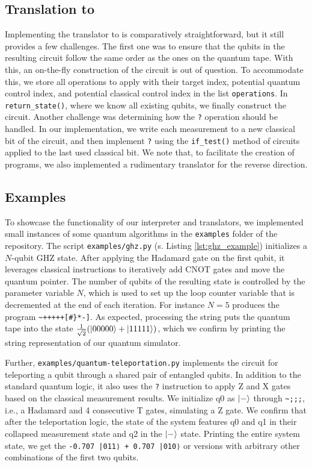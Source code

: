 \subsection{Translation to \qiskit{}}
\label{sec:approach-translations}

Implementing the translator to \qiskit{} is comparatively straightforward, but it still provides a few challenges. The first one was to ensure that the qubits in the resulting \qiskit{} circuit follow the same order as the ones on the quantum tape. With this, an on-the-fly construction of the circuit is out of question. To accommodate this, we store all operations to apply with their target index, potential quantum control index, and potential classical control index in the list \texttt{operations}. In \texttt{return\_state()}, where we know all existing qubits, we finally construct the \qiskit{} circuit.
Another challenge was determining how the \texttt{?} operation should be handled. In our implementation, we write each measurement to a new classical bit of the \qiskit{} circuit, and then implement \texttt{?} using the \texttt{if\_test()} method of \qiskit{} circuits applied to the last used classical bit.
We note that, to facilitate the creation of \bfck{} programs, we also implemented a rudimentary translator for the reverse direction.

\subsection{Examples}
\label{sec:approach-examples}

To showcase the functionality of our interpreter and translators, we implemented small instances of some quantum algorithms in the \texttt{examples} folder of the repository.
The script \texttt{examples/ghz.py} (s. Listing \ref{lst:ghz_example}) initializes a $N$-qubit GHZ state.
After applying the Hadamard gate on the first qubit, it leverages classical instructions to iteratively add CNOT gates and move the quantum pointer.
The number of qubits of the resulting state is controlled by the parameter variable $N$, which is used to set up the loop counter variable that is decremented at the end of each iteration.
For instance $N=5$ produces the \bfq{} program \texttt{\textasciitilde +++++[\#\}*-]}.
As expected, processing the string puts the quantum tape into the state $\frac{1}{\sqrt{2}} (\ket{00000} + \ket{11111})$, which we confirm by printing the string representation of our quantum simulator.

Further, \texttt{examples/quantum-teleportation.py} implements the circuit for teleporting a qubit through a shared pair of entangled qubits.
In addition to the standard quantum logic, it also uses the \texttt{?} instruction to apply Z and X gates based on the classical measurement results.
We initialize q0 as $\ket{-}$ through \texttt{\textasciitilde ;;;}, i.e., a Hadamard and 4 consecutive T gates, simulating a Z gate.
We confirm that after the teleportation logic, the state of the system features q0 and q1 in their collapsed measurement state and q2 in the $\ket{-}$ state.
Printing the entire system state, we get the \texttt{-0.707 |011⟩ + 0.707 |010⟩} or versions with arbitrary other combinations of the first two qubits.

